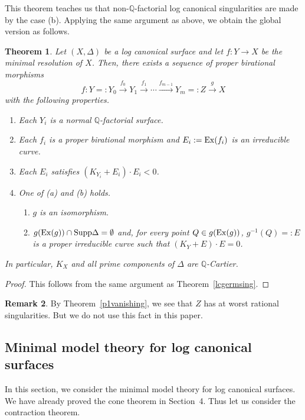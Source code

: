 \documentclass[12pt,twoside]{amsart}
\newcommand{\Supp}[0]{{\operatorname{Supp}}}
\newtheorem{thm}{Theorem}[section]
\theoremstyle{definition}
\newtheorem{rem}[thm]{Remark}
\newcommand{\Q}{$\mathbb{Q}$}
\begin{document}
This theorem teaches us that 
non-\Q-factorial log canonical singularities are made by the case (b). 
Applying the same argument as above, 
we obtain the global version as follows.


\begin{thm}\label{lcsing}
Let $(X, \Delta)$ be a log canonical surface and 
let $f:Y \to X$ be the minimal resolution of $X$. 
Then, there exists a sequence of proper birational morphisms 
$$
f:Y=:Y_0\overset{f_0}\to Y_1\overset{f_1}\to \cdots 
\overset{f_{m-1}}\to Y_m=:Z\overset{g}\to X 
$$
with the following properties. 
\begin{enumerate}
\item[(1)]{Each $Y_i$ is a normal \Q-factorial surface.}
\item[(2)]{Each $f_i$ is a proper birational morphism and 
$E_i:={\rm Ex}(f_i)$ is an irreducible curve.}
\item[(3)]{Each $E_i$ satisfies $(K_{Y_i}+E_i)\cdot E_i<0$.}
\item[(4)]{One of {\em{(a)}} and {\em{(b)}} holds. 
\begin{enumerate}
\item[(a)]{$g$ is an isomorphism.}
\item[(b)]{$g({\rm Ex}(g))\cap\Supp\Delta=\emptyset$ and, for every point $Q\in g({\rm Ex}(g))$, 
$g^{-1}(Q)=:E$ is a proper irreducible curve such that $(K_Y+E)\cdot E=0$.}
\end{enumerate}}\end{enumerate}
In particular, $K_X$ and all prime components of $\Delta$ are \Q-Cartier.
\end{thm}

\begin{proof}
This follows from the same argument as Theorem~\ref{lcgermsing}.
\end{proof}


\begin{rem}
By Theorem~\ref{p1vanishing}, 
we see that $Z$ has at worst rational singularities. 
But we do not use this fact in this paper. 
\end{rem}



\subsection{Minimal model theory for log canonical surfaces}

In this section, 
we consider the minimal model theory for log canonical surfaces. 
We have already proved the cone theorem in Section~4. 
Thus let us consider the contraction theorem. 
\end{document}
